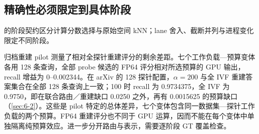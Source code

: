 \subsection{精确性必须限定到具体阶段}
\label{sec:7-recall-attribution}

的阶段契约区分计算分数选择与原始空间 kNN；lane 舍入、截断并列与进程变化限定不同阶段。




归档重建 pilot 测量了相对全探针重建评分的剩余差距。七个工作负载—预算变体各用 128 条查询，全部 probe 候选的 FP64 评分相对所选预算的 GPU 输出，recall 增益为 0--0.002344。在 arXiv 的 128 探针配置，$\alpha=200$ 与全 IVF 重建答案集合在全部 128 条查询上一致；100 时 recall 为 0.9734375，全 IVF 为 0.9750，即在联合路由／重建缺口 0.0250 之外，再有 0.0015625 的预算缺口（\cref{sec:6-2}）。这些是 pilot 特定的总体差异，七个变体包含同一数据集—探针工作负载的两个预算。FP64 重建评分也不同于 GPU 运算，因而不能在每个变体中单独隔离纯预算效应。进一步分开路由与表示，需要逐阶段 GT 覆盖检查。
